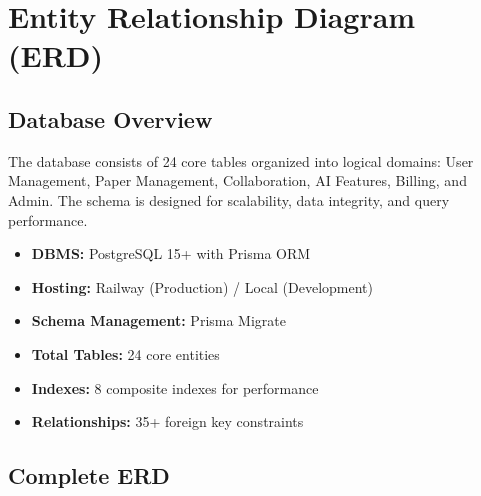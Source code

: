 \chapter{Entity Relationship Diagram (ERD)}
\label{ch:erd}

\section{Database Overview}
\label{sec:erd-overview}

The \projectname{} database consists of 24 core tables organized into logical domains: User Management, Paper Management, Collaboration, AI Features, Billing, and Admin. The schema is designed for scalability, data integrity, and query performance.

\begin{infobox}
\begin{itemize}
    \item \textbf{DBMS:} PostgreSQL 15+ with Prisma ORM
    \item \textbf{Hosting:} Railway (Production) / Local (Development)
    \item \textbf{Schema Management:} Prisma Migrate
    \item \textbf{Total Tables:} 24 core entities
    \item \textbf{Indexes:} 8 composite indexes for performance
    \item \textbf{Relationships:} 35+ foreign key constraints
\end{itemize}
\end{infobox}

\section{Complete ERD}
\label{sec:erd-diagram}

